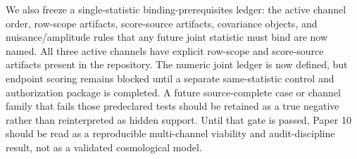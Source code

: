We also freeze a single-statistic binding-prerequisites ledger: the active
channel order, row-scope artifacts, score-source artifacts, covariance objects,
and nuisance/amplitude rules that any future joint statistic must bind are now
named.  All three active channels have explicit row-scope and score-source
artifacts present in the repository.  The numeric joint ledger is now defined,
but endpoint scoring remains blocked until a separate same-statistic control
and authorization package is completed.
A future source-complete case or channel family that fails those
predeclared tests should be retained as a true negative rather than reinterpreted
as hidden support.  Until that gate is passed, Paper 10 should be read as a
reproducible multi-channel viability and audit-discipline result, not as a
validated cosmological model.

